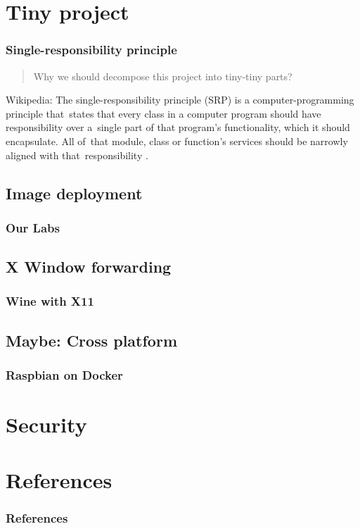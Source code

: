\documentclass{beamer}
\begin{document}
\section{Tiny project}
\begin{frame}
    \frametitle{Single-responsibility principle}
    \begin{quote}
        Why we should decompose this project into tiny-tiny parts?
    \end{quote}

    \begin{block}{Wikipedia:}
        The single-responsibility principle (SRP) is a computer-programming principle that\
        states that every class in a computer program should have responsibility over a\
        single part of that program's functionality, which it should encapsulate. All of\
        that module, class or function's services should be narrowly aligned with that\
        responsibility \cite{SRP_wiki}.
    \end{block}
\end{frame}
\subsection{Image deployment}
\begin{frame}
    \frametitle{Our Labs}
\end{frame}

\subsection{X Window forwarding}
\begin{frame}
    \frametitle{Wine with X11}
\end{frame}

\subsection{Maybe: Cross platform}
\begin{frame}
    \frametitle{Raspbian on Docker}
\end{frame}

\section{Security}

\section{References}
\begin{frame}[t, allowframebreaks]
    \frametitle{References}
    \printbibliography
\end{frame}
\end{document}
